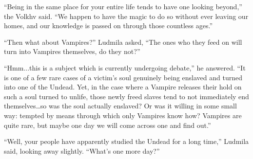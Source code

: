  

“Being in the same place for your entire life tends to have one looking beyond,” the Volkhv said. “We happen to have the magic to do so without ever leaving our homes, and our knowledge is passed on through those countless ages.”

 

“Then what about Vampires?” Ludmila asked, “The ones who they feed on will turn into Vampires themselves, do they not?”

 

“Hmm...this is a subject which is currently undergoing debate,” he answered. “It is one of a few rare cases of a victim’s soul genuinely being enslaved and turned into one of the Undead. Yet, in the case where a Vampire releases their hold on such a soul turned to unlife, those newly freed slaves tend to not immediately end themselves…so was the soul actually enslaved? Or was it willing in some small way: tempted by means through which only Vampires know how? Vampires are quite rare, but maybe one day we will come across one and find out.”

 

“Well, your people have apparently studied the Undead for a long time,” Ludmila said, looking away slightly. “What’s one more day?”